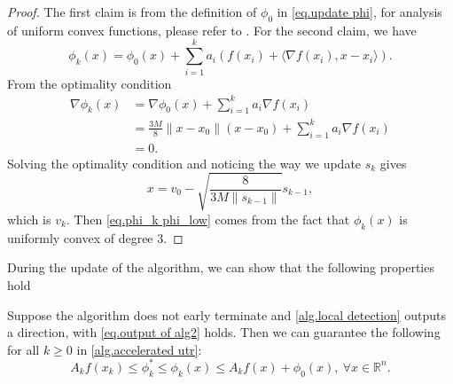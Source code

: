 \documentclass{article}
\begin{document}
\begin{proof}
    The first claim is from the definition of $\phi_0$ in \eqref{eq.update phi}, for analysis of uniform convex functions, please refer to \citet[Section 4.2.2]{nesterov_lectures_2018}. For the second claim, we have
    \begin{equation}
        \label{eq.phi recursive}
        \phi_k(x) = \phi_0(x)+\sum_{i=1}^ka_i\left (f(x_i)+\langle \nabla f(x_i),x-x_i\rangle \right).
    \end{equation}
    From the optimality condition
    \begin{equation*}
    \begin{aligned}
        \nabla \phi_k(x) &= \nabla \phi_0(x)+ \sum_{i=1}^k a_i\nabla f(x_i)\\
        &= \frac{3M}{8}\|x-x_0\|(x-x_0)+\sum_{i=1}^k a_i\nabla f(x_i)\\
        &=0.
    \end{aligned}
    \end{equation*}
    Solving the optimality condition and noticing the way we update $s_k$ gives 
    \begin{equation*}
        x = v_0 - \sqrt{\frac{8}{3M\|s_{k-1}\|}}s_{k-1},
    \end{equation*}
    which is $v_k$. Then \eqref{eq.phi_k phi_low} comes from the fact that $\phi_k(x)$ is uniformly convex of degree 3.
\end{proof}
During the update of the algorithm, we can show that the following properties hold
\begin{lemma}\label{lem.estimate sequence}
Suppose the algorithm does not early terminate and \autoref{alg.local detection} outputs a direction, with \eqref{eq.output of alg2} holds. Then we can guarantee the following for all $k\geq 0$ in \autoref{alg.accelerated utr}:
\begin{equation}
    \label{eq.estimating sequence relation}
    A_k f(x_k)\leq \phi_k^*  \leq \phi_k(x)\leq A_k f(x)+\phi_0(x), \ \forall x\in \mathbb{R}^n.
\end{equation}
\end{lemma}
\end{document}
